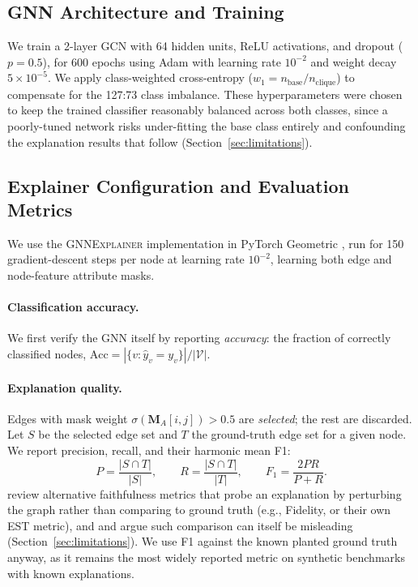 \documentclass{article}
\newcommand{\GNNEx}{\textsc{GNNExplainer}\xspace}
\newcommand{\calV}{\mathcal{V}}
\newcommand{\bfM}{\mathbf{M}}
\newcommand{\sigmoid}{\sigma}
\theoremstyle{definition}
\begin{document}
\subsection{GNN Architecture and Training}

We train a 2-layer GCN \citep{kipf2017semi} with 64 hidden units, ReLU
activations, and dropout ($p=0.5$), for 600 epochs using Adam
\citep{kingma2015adam} with learning rate $10^{-2}$ and weight decay
$5\times10^{-5}$. We apply class-weighted cross-entropy
($w_1 = n_{\mathrm{base}}/n_{\mathrm{clique}}$) to compensate for the 127:73
class imbalance. These hyperparameters were chosen to keep the trained
classifier reasonably balanced across both classes, since a poorly-tuned
network risks under-fitting the base class entirely and confounding the
explanation results that follow (Section~\ref{sec:limitations}).

\subsection{Explainer Configuration and Evaluation Metrics}

We use the \GNNEx implementation in PyTorch Geometric \citep{fey2019fast},
run for 150 gradient-descent steps per node at learning rate $10^{-2}$, learning
both edge and node-feature attribute masks.

\paragraph{Classification accuracy.}
We first verify the GNN itself by reporting \emph{accuracy}: the fraction of
correctly classified nodes, $\mathrm{Acc} = |\{v : \hat{y}_v = y_v\}| / |\calV|$.

\paragraph{Explanation quality.}
Edges with mask weight $\sigmoid(\bfM_A[i,j]) > 0.5$ are \emph{selected}; the
rest are discarded. Let $S$ be the selected edge set and $T$ the ground-truth
edge set for a given node. We report precision, recall, and their harmonic
mean F1:
\begin{equation}
  P = \frac{|S \cap T|}{|S|}, \qquad
  R = \frac{|S \cap T|}{|T|}, \qquad
  F_1 = \frac{2PR}{P + R}.
  \label{eq:f1}
\end{equation}
\citet{azzolin2026gnnexplanations} review alternative faithfulness metrics
that probe an explanation by perturbing the graph rather than comparing to
ground truth (e.g., Fidelity, or their own EST metric), and
\citet{faber2021when} and \citet{agarwal2022probing} argue such comparison
can itself be misleading (Section~\ref{sec:limitations}). We use F1 against
the known planted ground truth anyway, as it remains the most widely
reported metric on synthetic benchmarks with known explanations.
\end{document}

